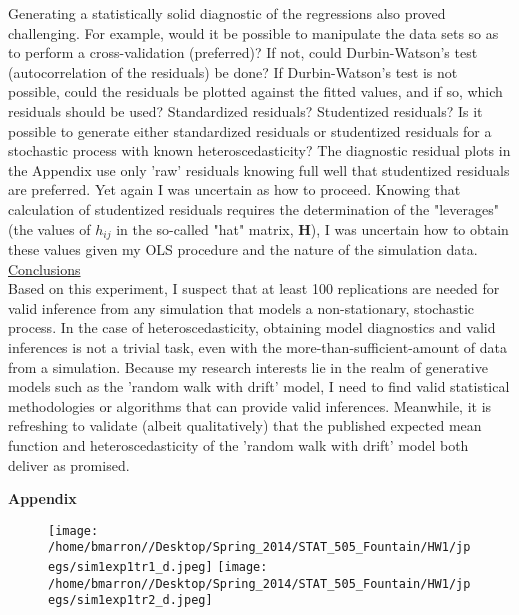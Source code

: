 \documentclass[a4paper,11pt]{article}
\begin{document}
Generating a statistically solid diagnostic of the regressions also proved challenging. For example, would it be possible to manipulate the data sets so as to perform a cross-validation (preferred)? If not, could Durbin-Watson's test (autocorrelation of the residuals) be done? If Durbin-Watson's test is not possible, could the residuals be plotted against the fitted values, and if so, which residuals should be used? Standardized residuals? Studentized residuals? Is it possible to generate either standardized residuals or studentized residuals for a stochastic process with known heteroscedasticity? 
\newpage
The diagnostic residual plots in the Appendix use only 'raw' residuals knowing full well that studentized residuals are preferred. Yet again I was uncertain as how to proceed. Knowing that calculation of studentized residuals requires the determination of the "leverages" (the values of $ h_{ij}$ in the so-called "hat" matrix, \textbf{H}), I was uncertain how to obtain these values given my OLS procedure and the nature of the simulation data. \\

\underline{Conclusions}\\

Based on this experiment, I suspect that at least 100 replications are needed for valid inference from any simulation that models a non-stationary, stochastic process. In the case of heteroscedasticity, obtaining model diagnostics and valid inferences is not a trivial task, even with the more-than-sufficient-amount of data from a simulation. Because my research interests lie in the realm of generative models such as the 'random walk with drift' model, I need to find valid statistical methodologies or algorithms that can provide valid inferences. Meanwhile, it is refreshing to validate (albeit qualitatively) that the published expected mean function and heteroscedasticity of the 'random walk with drift' model both deliver as promised.

\newpage

\begin{center}
\textbf{Appendix}
\end{center}

\newpage
\begin{figure}
    \texttt{[image: /home/bmarron//Desktop/Spring\_2014/STAT\_505\_Fountain/HW1/jpegs/sim1exp1tr1\_d.jpeg]}
     \texttt{[image: /home/bmarron//Desktop/Spring\_2014/STAT\_505\_Fountain/HW1/jpegs/sim1exp1tr2\_d.jpeg]}
\end{figure}
\end{document}
